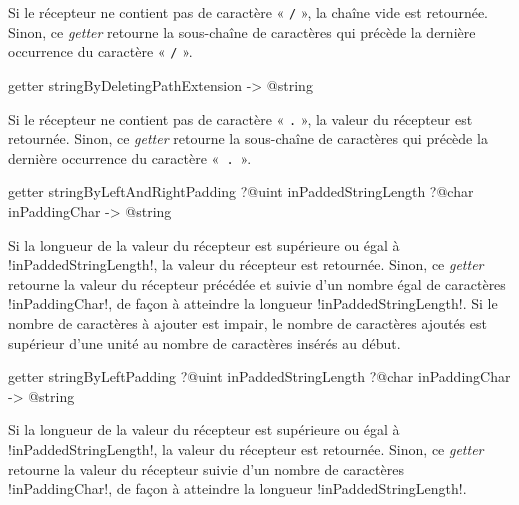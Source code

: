 Si le récepteur ne contient pas de caractère « \texttt{/} », la chaîne vide est retournée. Sinon, ce \emph{getter} retourne la sous-chaîne de caractères qui précède la dernière occurrence du caractère « \texttt{/} ».










\begin{galgasbox}
getter stringByDeletingPathExtension -> @string
\end{galgasbox}

Si le récepteur ne contient pas de caractère « \texttt{.} », la valeur du récepteur est retournée. Sinon, ce \emph{getter} retourne la sous-chaîne de caractères qui précède la dernière occurrence du caractère «~\texttt{.}~».









\begin{galgasbox}
getter stringByLeftAndRightPadding
   ?@uint inPaddedStringLength
   ?@char inPaddingChar -> @string
\end{galgasbox}

Si la longueur de la valeur du récepteur est supérieure ou égal à \ggs!inPaddedStringLength!, la valeur du récepteur est retournée. Sinon, ce \emph{getter} retourne la valeur du récepteur précédée et suivie d'un nombre égal de caractères \ggs!inPaddingChar!, de façon à atteindre la longueur \ggs!inPaddedStringLength!. Si le nombre de caractères à ajouter est impair, le nombre de caractères ajoutés est supérieur d'une unité au nombre de caractères insérés au début.









\begin{galgasbox}
getter stringByLeftPadding
   ?@uint inPaddedStringLength
   ?@char inPaddingChar -> @string
\end{galgasbox}

Si la longueur de la valeur du récepteur est supérieure ou égal à \ggs!inPaddedStringLength!, la valeur du récepteur est retournée. Sinon, ce \emph{getter} retourne la valeur du récepteur suivie d'un nombre de caractères \ggs!inPaddingChar!, de façon à atteindre la longueur \ggs!inPaddedStringLength!.







